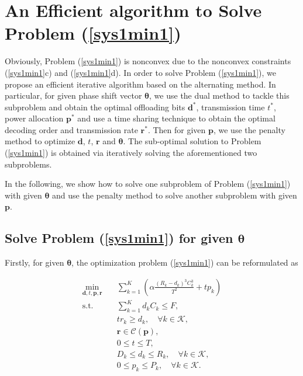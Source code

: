 \documentclass[journal]{IEEEtran}
\begin{document}
\section{An Efficient algorithm to Solve Problem (\ref{sys1min1})}

Obviously, Problem (\ref{sys1min1}) is nonconvex due to the nonconvex constraints (\ref{sys1min1}c) and (\ref{sys1min1}d). In order to solve Problem (\ref{sys1min1}), we propose an efficient iterative algorithm based on the alternating method. In particular, for given phase shift vector $\pmb \theta$, we use the dual method to tackle this subproblem and obtain the optimal offloading bits $\pmb d^*$, transmission time $t^*$, power allocation $\pmb p^*$ and use a time sharing technique to obtain the optimal decoding order and transmission rate $\pmb r^*$.
Then for given $\pmb p$, we use the penalty method to optimize $\pmb d$, $t$, $\pmb r$ and $\pmb \theta$.
The sub-optimal solution to Problem (\ref{sys1min1}) is obtained via iteratively solving the aforementioned two subproblems.

In the following, we show how to solve one subproblem of Problem (\ref{sys1min1}) with given $\pmb \theta$ and use the penalty method to solve another subproblem with given $\pmb p$.

\subsection{Solve Problem (\ref{sys1min1}) for given $\pmb \theta$}

Firstly, for given $\pmb \theta$, the optimization problem (\ref{sys1min1}) can be reformulated as

\begin{subequations}\label{sys1min2}
	\begin{align}
	\mathop{\min}_{\pmb d,t,\pmb p,\pmb r}\quad
	&\sum_{k=1}^K \left(\alpha\frac{(R_{k}-d_{k})^3 C^3_{k}}{T^2}+tp_k\right)
	\\
	\textrm{s.t.}\quad
	& \sum_{k=1}^K d_{k} C_{k}\leq F,\\
	& tr_k\geq d_k, \quad \forall k\in\mathcal K,\\
	& \pmb r \in \mathcal C(\pmb p),\\
	& 0\leq t \leq T,\\
	&  D_{k} \leq d_{k} \leq R_{k}, \quad \forall k\in\mathcal K,\\
	&  0\leq p_k\leq P_k, \quad \forall k\in\mathcal K.
	\end{align}
\end{subequations}
\end{document}

